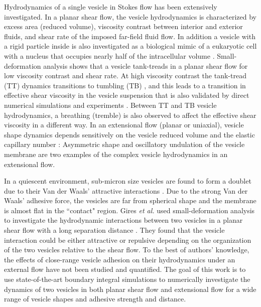 \documentclass[%
preprint,
 amsmath,amssymb,
 aps,
]{revtex4-1}
\begin{document}
Hydrodynamics of a single vesicle in Stokes flow has been extensively investigated. In a planar shear flow, the vesicle hydrodynamics is characterized by
excess area (reduced volume), viscosity contrast between interior and exterior fluids, and shear rate of the imposed far-field fluid flow. In addition a vesicle
with a rigid particle inside is also investigated as a biological mimic of a 
eukaryotic cell with a nucleus that occupies nearly half of the intracellular volume \cite{Veerapaneni2011_PRL}. Small-deformation analysis shows that
a vesicle tank-treads in a planar shear flow for low viscosity contrast and shear rate. At high viscosity contrast the tank-tread (TT) dynamics transitions to tumbling (TB) \cite{Misbah2006_PRL,Vlahovska2007_PRE} ,
and this leads to a transition in effective shear viscosity in the vesicle suspension \cite{Misbah2006_PRL,Vitkova2008_BJ} that is also validated
by direct numerical simulations \cite{GhigliottiBibenMisbah2010_JFM} and experiments \cite{KantslerSegreSteinberg2008_EPL,ZabuskySegreDeschamps2011_PoF}.
Between TT and TB vesicle hydrodynamics, a breathing (tremble) is also observed \cite{Misbah2006_PRL,KantslerSegreSteinberg2008_PRL,ZhaoShaqfeh2011_JFM,SpannZhaoShaqfeh2014_PoF} to affect the effective shear viscosity in a 
different way.
%
In an extensional flow (planar or uniaxial), vesicle shape dynamics
depends sensitively on the vesicle reduced volume  and the elastic capillary number \cite{KantslerSegreSteinberg2008_PRL,ZhaoShaqfeh2013_JFM,Narsimhan2014_JFM,DahlNarsimhanGouveia2016_SoftMatt}: Asymmetric shape and oscillatory undulation of the vesicle membrane are two examples of the complex vesicle hydrodynamics in an extensional flow.

In a quiescent environment, sub-micron size vesicles are found to form a doublet due to their Van der Waals' attractive interactions \cite{RamachandranAndersonLealIsraelachvili2010_Langmuir}. Due to the strong Van der Waals' adhesive force, the vesicles are far
from spherical shape and the membrane is almost flat in the ``contact" region. Gires {\it et al.} used small-deformation analysis to investigate the hydrodynamic
interactions between two vesicles in a planar shear flow with a long separation distance \cite{GiresDankerMisbah2012_PRE}. They found that the vesicle interaction could be either attractive or repulsive depending on the organization of the two vesicles relative to the shear flow. To the best of authors' knowledge,
the effects of close-range vesicle adhesion on their hydrodynamics under an external flow have not been studied and quantified. The goal of this work is to use
state-of-the-art boundary integral simulations to numerically investigate the dynamics of two vesicles in both planar shear flow and extensional flow for a wide range of vesicle shapes and adhesive strength and distance.
\end{document}
